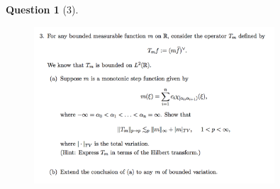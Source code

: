 \documentclass{article} %
\theoremstyle{quest}
\newtheorem*{question}{Question}
\begin{document}
\newpage

\begin{question}[3]
\hfill
\begin{figure}[h!]
  \centering
    \includegraphics[width=0.8\textwidth]{HA-f-3.png}
\end{figure}
\end{question}
\end{document}
